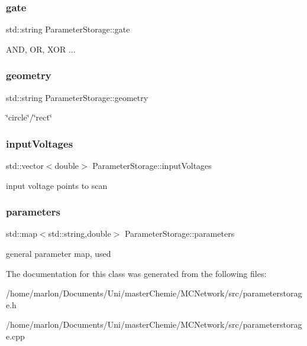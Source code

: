 \subsubsection{\texorpdfstring{gate}{gate}}
{\footnotesize\ttfamily std\+::string Parameter\+Storage\+::gate}

A\+ND, OR, X\+OR ... \mbox{\label{classParameterStorage_a67fb9f2ff387b416e39c62db6ec85473}} 
\subsubsection{\texorpdfstring{geometry}{geometry}}
{\footnotesize\ttfamily std\+::string Parameter\+Storage\+::geometry}

\char`\"{}circle\char`\"{}/\char`\"{}rect\char`\"{} \mbox{\label{classParameterStorage_a139852057ae4212e7365da8f48a8ff1f}} 
\subsubsection{\texorpdfstring{input\+Voltages}{inputVoltages}}
{\footnotesize\ttfamily std\+::vector$<$double$>$ Parameter\+Storage\+::input\+Voltages}

input voltage points to scan \mbox{\label{classParameterStorage_a3ae6709dcacaf500c8f57808a52d9be2}} 
\subsubsection{\texorpdfstring{parameters}{parameters}}
{\footnotesize\ttfamily std\+::map$<$std\+::string,double$>$ Parameter\+Storage\+::parameters}

general parameter map, used 

The documentation for this class was generated from the following files\+:\begin{DoxyCompactItemize}
\item 
/home/marlon/\+Documents/\+Uni/master\+Chemie/\+M\+C\+Network/src/parameterstorage.\+h\item 
/home/marlon/\+Documents/\+Uni/master\+Chemie/\+M\+C\+Network/src/parameterstorage.\+cpp\end{DoxyCompactItemize}
